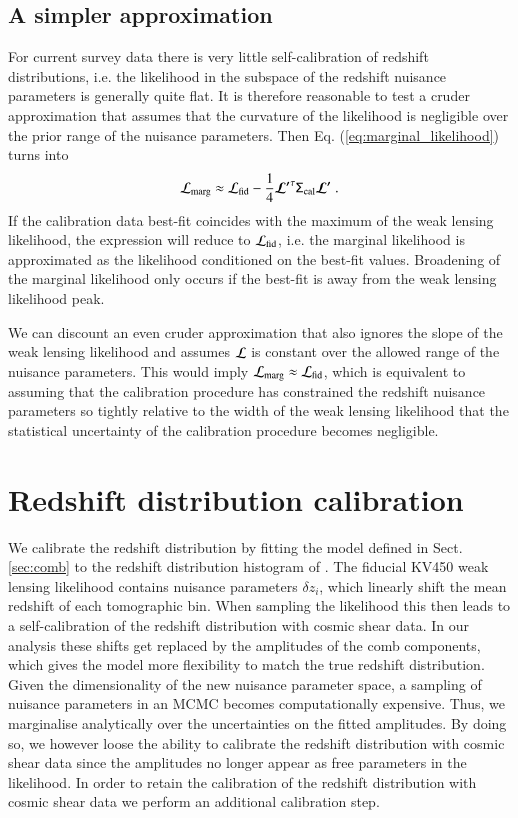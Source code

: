 \documentclass{aa}
\newcommand{\eq}[1]{\begin{equation}  #1 \end{equation}}
\begin{document}
\subsection{A simpler approximation}

For current survey data there is very little self-calibration of redshift distributions, i.e. the likelihood in the subspace of the redshift nuisance parameters is generally quite flat. It is therefore reasonable to test a cruder approximation that assumes that the curvature of the likelihood is negligible over the prior range of the nuisance parameters. Then Eq. (\ref{eq:marginal_likelihood}) turns into
\eq{
{\cal L}_{\rm marg} \approx {\cal L}_{\rm fid} - \frac{1}{4} \boldsymbol{\cal L^\prime}^\tau  \tens{\Sigma}_{\rm cal} \boldsymbol{\cal L^\prime} \;.
}
If the calibration data best-fit coincides with the maximum of the weak lensing likelihood, the expression will reduce to ${\cal L}_{\rm fid}$, i.e. the marginal likelihood is approximated as the likelihood conditioned on the best-fit values. Broadening of the marginal likelihood only occurs if the best-fit is away from the weak lensing likelihood peak.

We can discount an even cruder approximation that also ignores the slope of the weak lensing likelihood and assumes ${\cal L}$ is constant over the allowed range of the nuisance parameters. This would imply ${\cal L}_{\rm marg} \approx {\cal L}_{\rm fid}$, which is equivalent to assuming that the calibration procedure has constrained the redshift nuisance parameters so tightly relative to the width of the weak lensing likelihood that the statistical uncertainty of the calibration procedure becomes negligible.
\section{Redshift distribution calibration}
\label{sec:calibration}
We calibrate the redshift distribution by fitting the model defined in Sect. \ref{sec:comb} to the redshift distribution histogram of \cite{hildebrandt18}. The fiducial KV450 weak lensing likelihood contains nuisance parameters $\delta z_i$, which linearly shift the mean redshift of each tomographic bin. When sampling the likelihood this then leads to a self-calibration of the redshift distribution with cosmic shear data. In our analysis these shifts get replaced by the amplitudes of the comb components, which gives the model more flexibility to match the true redshift distribution. Given the dimensionality of the new nuisance parameter space, a sampling of nuisance parameters in an MCMC becomes computationally expensive. Thus, we marginalise analytically over the uncertainties on the fitted amplitudes. By doing so, we however loose the ability to calibrate the redshift distribution with cosmic shear data since the amplitudes no longer appear as free parameters in the likelihood. In order to retain the calibration of the redshift distribution with cosmic shear data we perform an additional calibration step.
\end{document}

